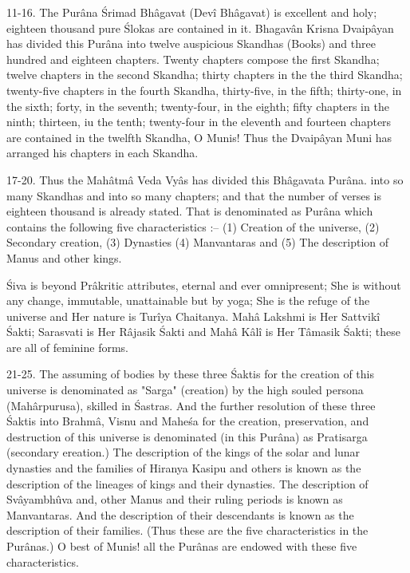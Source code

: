 11-16. The Pur\^ana \'Srimad Bh\^agavat (Dev\^i Bh\^agavat) is excellent and holy; eighteen thousand pure \'Slokas are contained in it. Bhagav\^an Krisna Dvaip\^ayan has divided this Pur\^ana into twelve auspicious Skandhas (Books) and three hundred and eighteen chapters. Twenty chapters compose the first Skandha; twelve chapters in the second Skandha; thirty chapters in the the third Skandha; twenty-five chapters in the fourth Skandha, thirty-five, in the fifth; thirty-one, in the sixth; forty, in the seventh; twenty-four, in the eighth; fifty chapters in the ninth; thirteen, iu the tenth; twenty-four in the eleventh and fourteen chapters are contained in the twelfth Skandha, O Munis! Thus the Dvaip\^ayan Muni has arranged his chapters in each Skandha.

17-20. Thus the Mah\^atm\^a Veda Vy\^as has divided this Bh\^agavata Pur\^ana. into so many Skandhas and into so many chapters; and that the number of verses is eighteen thousand is already stated. That is denominated as Pur\^ana which contains the following five characteristics :-- (1) Creation of the universe, (2) Secondary creation, (3) Dynasties (4) Manvantaras and (5) The description of Manus and other kings.

\'Siva is beyond Pr\^akritic attributes, eternal and ever omnipresent; She is without any change, immutable, unattainable but by yoga; She is the refuge of the universe and Her nature is Tur\^iya Chaitanya. Mah\^a Lakshmi is Her Sattvik\^i \'Sakti; Sarasvati is Her R\^ajasik \'Sakti and Mah\^a K\^al\^i is Her T\^amasik \'Sakti; these are all of feminine forms.

21-25. The assuming of bodies by these three \'Saktis for the creation of this universe is denominated as "Sarga" (creation) by the high souled persona (Mah\^arpurusa), skilled in \'Sastras. And the further resolution of these three \'Saktis into Brahm\^a, Visnu and Mahe\'sa for the creation, preservation, and destruction of this universe is denominated (in this Pur\^ana) as Pratisarga (secondary ereation.) The description of the kings of the solar and lunar dynasties and the families of Hiranya Kasipu and others is known as the description of the lineages of kings and their dynasties. The description of Sv\^ayambh\^uva and, other Manus and their ruling periods is known as Manvantaras. And the description of their descendants is known as the description of their families. (Thus these are the five characteristics in the Pur\^anas.) O best of Munis! all the Pur\^anas are endowed with these five characteristics.

